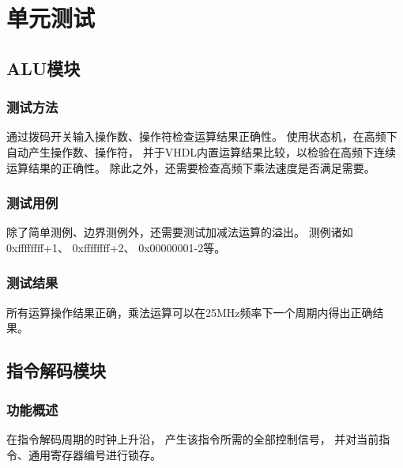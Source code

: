 \section{单元测试}


    \subsection{ALU模块}


        \subsubsection{测试方法}
            通过拨码开关输入操作数、操作符检查运算结果正确性。%
            使用状态机，在高频下自动产生操作数、操作符，%
            并于VHDL内置运算结果比较，以检验在高频下连续运算结果的正确性。%
            除此之外，还需要检查高频下乘法速度是否满足需要。

        \subsubsection{测试用例}
            除了简单测例、边界测例外，还需要测试加减法运算的溢出。
            测例诸如%
            0xffffffff+1、%
            0xffffffff+2、%
            0x00000001-2等。

        \subsubsection{测试结果}
            所有运算操作结果正确，乘法运算可以在25MHz频率下一个周期内得出正确结果。

    \subsection{指令解码模块}
        \subsubsection{功能概述}
            在指令解码周期的时钟上升沿，%
            产生该指令所需的全部控制信号，%
            并对当前指令、通用寄存器编号进行锁存。

